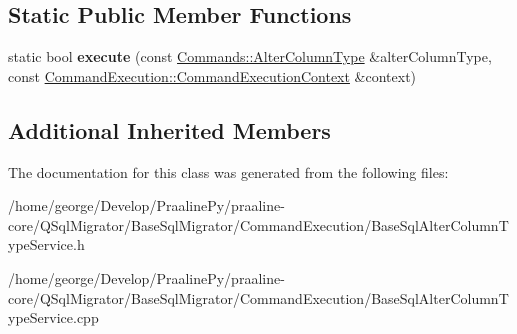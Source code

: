 \subsection*{Static Public Member Functions}
\begin{DoxyCompactItemize}
\item 
\mbox{\label{class_q_sql_migrator_1_1_command_execution_1_1_base_sql_alter_column_type_service_ac9d253c83ee0341e445ad197734e132f}} 
static bool {\bfseries execute} (const \hyperlink{class_q_sql_migrator_1_1_commands_1_1_alter_column_type}{Commands\+::\+Alter\+Column\+Type} \&alter\+Column\+Type, const \hyperlink{class_q_sql_migrator_1_1_command_execution_1_1_command_execution_context}{Command\+Execution\+::\+Command\+Execution\+Context} \&context)
\end{DoxyCompactItemize}
\subsection*{Additional Inherited Members}


The documentation for this class was generated from the following files\+:\begin{DoxyCompactItemize}
\item 
/home/george/\+Develop/\+Praaline\+Py/praaline-\/core/\+Q\+Sql\+Migrator/\+Base\+Sql\+Migrator/\+Command\+Execution/Base\+Sql\+Alter\+Column\+Type\+Service.\+h\item 
/home/george/\+Develop/\+Praaline\+Py/praaline-\/core/\+Q\+Sql\+Migrator/\+Base\+Sql\+Migrator/\+Command\+Execution/Base\+Sql\+Alter\+Column\+Type\+Service.\+cpp\end{DoxyCompactItemize}
